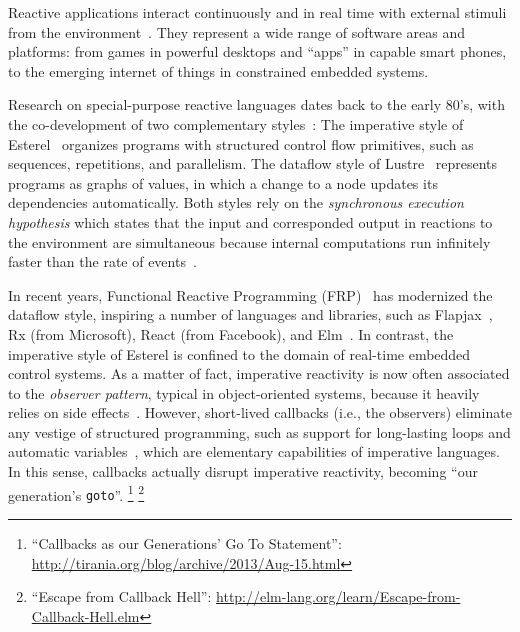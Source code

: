 \documentclass{acm_proc_article-sp}
\newcommand{\code}[1] {{\small{\texttt{#1}}}}
\newcommand{\1}{\;}
\newcommand{\2}{\;\;}
\newcommand{\3}{\;\;\;}
\newcommand{\5}{\;\;\;\;\;}
\begin{document}
Reactive applications interact continuously and in real time with external 
stimuli from the environment~\cite{statecharts.reactive,rp.synchronous}.
They represent a wide range of software areas and platforms: from games in 
powerful desktops and ``apps'' in capable smart phones, to the emerging 
internet of things in constrained embedded systems.

Research on special-purpose reactive languages dates back to the early 80's, 
with the co-development of two complementary 
styles~\cite{rp.twelve,rp.hypothesis}:
%
The imperative style of Esterel~\cite{esterel.ieee91} organizes programs with 
structured control flow primitives, such as sequences, repetitions, and 
parallelism.
%
The dataflow style of Lustre~\cite{lustre.ieee91} represents programs as graphs 
of values, in which a change to a node updates its dependencies automatically.
%
Both styles rely on the \emph{synchronous execution hypothesis} which states 
that the input and corresponded output in reactions to the environment are 
simultaneous because internal computations run infinitely faster than the rate 
of events~\cite{rp.hypothesis}.

In recent years, Functional Reactive Programming (FRP)~\cite{frp.principles} 
has modernized the dataflow style, inspiring a number of languages and 
libraries, such as Flapjax~\cite{frp.flapjax}, Rx (from Microsoft), React (from 
Facebook), and Elm~\cite{frp.elm}.
%
In contrast, the imperative style of Esterel is confined to the domain of 
real-time embedded control systems.
%
As a matter of fact, imperative reactivity is now often associated to the 
\emph{observer pattern}, typical in object-oriented systems, because it heavily 
relies on side effects~\cite{rp.deprecating,rp.rescala}.
%
However, short-lived callbacks (i.e., the observers) eliminate any vestige of 
structured programming, such as support for long-lasting loops and automatic 
variables~\cite{sync_async.cooperative}, which are elementary capabilities of 
imperative languages.
%
In this sense, callbacks actually disrupt imperative reactivity, becoming ``our 
generation's \code{goto}''.%
\footnote{``Callbacks as our Generations' Go To Statement'':
\url{http://tirania.org/blog/archive/2013/Aug-15.html}}%
\footnote{``Escape from Callback Hell'':
\url{http://elm-lang.org/learn/Escape-from-Callback-Hell.elm}}
\end{document}
